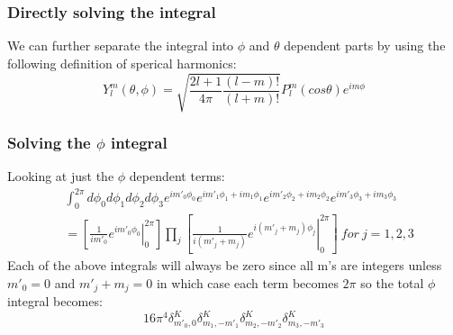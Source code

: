 \documentclass{beamer}
\begin{document}
    \begin{frame}
        \frametitle{Directly solving the integral}
        We can further separate the integral into $\phi$ and $\theta$ dependent parts by using the following definition of 
        sperical harmonics:
        \begin{equation*}
            Y_l^m (\theta, \phi) = \sqrt{\frac{2l + 1}{4 \pi} \frac{(l-m)!}{(l+m)!}} P_l^m (cos \theta) e^{im\phi}
        \end{equation*}
    \end{frame}

    \begin{frame}
        \frametitle{Solving the $\phi$ integral}
        Looking at just the $\phi$ dependent terms:
        \begin{align*}
            &\int_0^{2\pi} d\phi_0 d\phi_1 d\phi_2 d\phi_3 e^{im'_0\phi_0}e^{im'_1\phi_1 + im_1\phi_1}e^{im'_2\phi_2 + im_2\phi_2}e^{im'_3\phi_3 + im_3\phi_3}\\
            &= \left[\left.\frac{1}{im'_0}e^{im'_0\phi_0}\right|_0^{2\pi}\right] \prod_j \left[\left.\frac{1}{i(m'_j + m_j)}e^{i(m'_j + m_j)\phi_j}\right|_0^{2\pi}\right]\ for\ j = 1,2,3
        \end{align*}
        Each of the above integrals will always be zero since all m's are integers unless $m'_0 = 0$ and $m'_j + m_j = 0$ in which case
        each term becomes $2\pi$ so the total $\phi$ integral becomes:
        \begin{equation*}
            16\pi^4 \delta^K_{m'_0,0} \delta^K_{m_1,-m'_1} \delta^K_{m_2,-m'_2} \delta^K_{m_3,-m'_3}
        \end{equation*}
    \end{frame}
\end{document}
